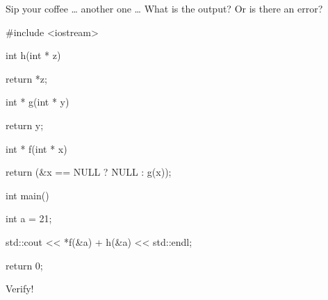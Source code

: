 Sip your coffee \ldots{} another one \ldots{} What is the output? Or is there an error?



\begin{consolethree}[escapeinside=||]

#include <iostream>



int h(int * z)

{   

    return *z;

}



int * g(int * y)

{   

    return y;

}



int * f(int * x)

{   

    return (&x == NULL ? NULL : g(x));

}



int main()

{   

    int a = 21;

    std::cout << *f(&a) + h(&a) << std::endl;

    return 0;

}

\end{consolethree}

Verify!

